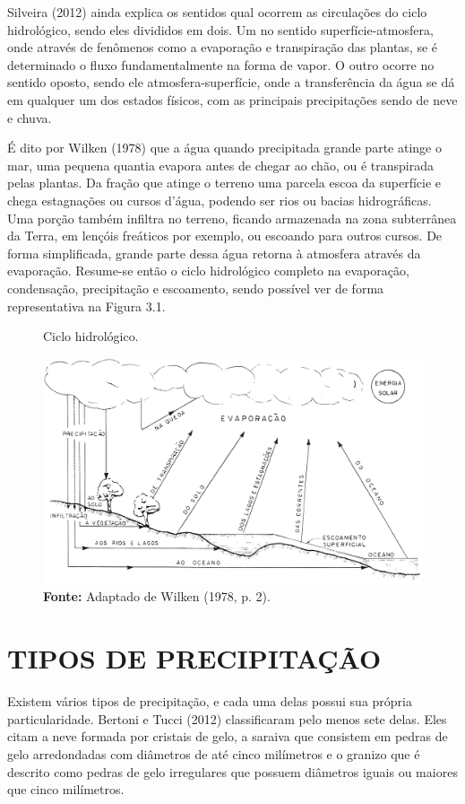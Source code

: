 Silveira (2012) ainda explica os sentidos qual ocorrem as circulações do ciclo hidrológico, sendo eles divididos em dois. Um no sentido superfície-atmosfera, onde através de fenômenos como a evaporação e transpiração das plantas, se é determinado o fluxo fundamentalmente na forma de vapor. O outro ocorre no sentido oposto, sendo ele atmosfera-superfície, onde a transferência da água se dá em qualquer um dos estados físicos, com as principais precipitações sendo de neve e chuva.

\newpage

É dito por Wilken (1978) que a água quando precipitada grande parte atinge o mar, uma pequena quantia evapora antes de chegar ao chão, ou é transpirada pelas plantas. Da fração que atinge o terreno uma parcela escoa da superfície e chega estagnações ou cursos d'água, podendo ser rios ou bacias hidrográficas. Uma porção também infiltra no terreno, ficando armazenada na zona subterrânea da Terra, em lençóis freáticos por exemplo, ou escoando para outros cursos. De forma simplificada, grande parte dessa água retorna à atmosfera através da evaporação. Resume-se então o ciclo hidrológico completo na evaporação, condensação, precipitação e escoamento, sendo possível ver de forma representativa na Figura 3.1.\bigskip

\begin{figure}[!ht]
	\centering
	\caption{Ciclo hidrológico.}
	\includegraphics[width=.7625\linewidth]{figuras/ciclo_hidrologico.png}
	\caption*{\textbf{Fonte:} Adaptado de Wilken (1978, p. 2).}
	\label{fig:ciclo_hidrologico.png}
\end{figure}

\section{TIPOS DE PRECIPITAÇÃO}

Existem vários tipos de precipitação, e cada uma delas possui sua própria particularidade. Bertoni e Tucci (2012) classificaram pelo menos sete delas. Eles citam a neve formada por cristais de gelo, a saraiva que consistem em pedras de gelo arredondadas com diâmetros de até cinco milímetros e o granizo que é descrito como pedras de gelo irregulares que possuem diâmetros iguais ou maiores que cinco milímetros.

